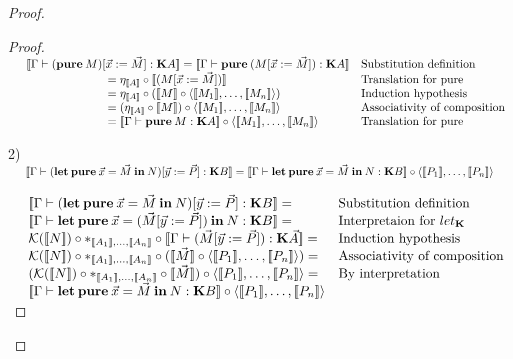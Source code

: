 \documentclass[a4paper]{article}
\begin{document}
\begin{proof}
\begin{proof}
$\begin{array}{lll}
& [\![\Gamma \vdash ({\bf pure \:} M) [ \vec{x} := \vec{M}] : {\bf K}A]\!] = [\![ \Gamma \vdash {\bf pure \:} (M [ \vec{x} := \vec{M}]) : {\bf K}A]\!] &
\text{Substitution definition} \\
& \quad\quad\quad\quad\quad\quad\quad = \eta_{[\![A]\!]} \circ [\![(M [ \vec{x} := \vec{M}])]\!]&
\text{Translation for pure}\\
& \quad\quad\quad\quad\quad\quad\quad = \eta_{[\![A]\!]} \circ ([\![M]\!] \circ \langle [\![M_1]\!], \dots,
[\![M_n]\!] \rangle) & \text{Induction hypothesis} \\
& \quad\quad\quad\quad\quad\quad\quad = (\eta_{[\![A]\!]} \circ [\![M]\!]) \circ \langle [\![M_1]\!], \dots,
[\![M_n]\!] \rangle & \text{Associativity of composition}\\
& \quad\quad\quad\quad\quad\quad\quad = [\![ \Gamma \vdash {\bf pure \:} M : {\bf K}A]\!] \circ \langle [\![M_1]\!], \dots,
[\![M_n]\!] \rangle& \text{Translation for pure}\\
\end{array}$

\vspace{\baselineskip}

2) $\begin{array}{lll}&[\![\Gamma \vdash ({\bf let \: pure} \: \vec{x} = \vec{M} {\: \bf in \:} N) [\vec{y} := \vec{P}] : {\bf K} B]\!]
=[\![\Gamma \vdash {\bf let \: pure} \: \vec{x} = \vec{M} {\: \bf in \:} N : {\bf K}B]\!] \circ \langle [\![P_1]\!],\dots,[\![P_n]\!]\rangle& \end{array}$

\vspace{\baselineskip}

$\begin{array}{lll}
&[\![\Gamma \vdash ({\bf let \: pure} \: \vec{x} = \vec{M} {\: \bf in \:} N) [\vec{y} := \vec{P}] : {\bf K} B]\!] =& \text{Substitution definition}\\
&[\![\Gamma \vdash {\bf let \: pure} \: \vec{x} = (\vec{M} [\vec{y} := \vec{P}]) {\: \bf in \:} N : {\bf K}B]\!] =& \text{Interpretaion for $let_{\bf K}$} \\
&\mathcal{K}([\![N]\!]) \circ \ast_{[\![A_1]\!],\dots,[\![A_n]\!]} \circ [\![\Gamma \vdash (\vec{M} [\vec{y} := \vec{P}]) : {\bf K}\vec{A}]\!] =& \text{Induction hypothesis} \\
&\mathcal{K}([\![N]\!]) \circ \ast_{[\![A_1]\!],\dots,[\![A_n]\!]} \circ ([\![\vec{M}]\!] \circ \langle [\![P_1]\!],\dots,[\![P_n]\!]\rangle) = & \text{Associativity of composition} \\
&(\mathcal{K}([\![N]\!]) \circ \ast_{[\![A_1]\!],\dots,[\![A_n]\!]} \circ [\![\vec{M}]\!]) \circ \langle [\![P_1]\!],\dots,[\![P_n]\!]\rangle = & \text{By interpretation} \\
&[\![\Gamma \vdash {\bf let \: pure} \: \vec{x} = \vec{M} {\: \bf in \:} N : {\bf K}B]\!] \circ \langle [\![P_1]\!],\dots,[\![P_n]\!]\rangle&
\end{array}$


\end{proof}
\end{proof}
\end{document}
